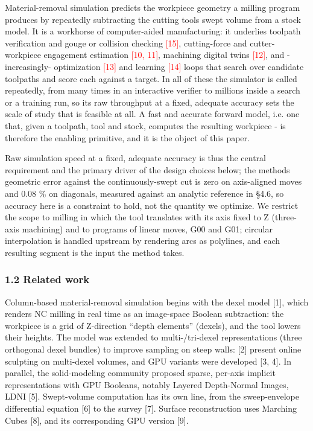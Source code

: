 \documentclass[
]{article}
\begin{document}
Material-removal simulation predicts the workpiece geometry a milling
program produces by repeatedly subtracting the cutting
tool\textquotesingle s swept volume from a stock model. It is a
workhorse of computer-aided manufacturing: it underlies toolpath
verification and gouge or collision checking \textcolor{red}{[15]}, cutting-force and
cutter-workpiece engagement estimation \textcolor{red}{[10, 11]}, machining digital
twins \textcolor{red}{[12]}, and -increasingly- optimization \textcolor{red}{[13]} and learning
\textcolor{red}{[14]} loops that search over candidate toolpaths and score each
against a target. In all of these the simulator is called repeatedly,
from many times in an interactive verifier to millions inside a search
or a training run, so its raw throughput at a fixed, adequate accuracy
sets the scale of study that is feasible at all. A fast and accurate
forward model, i.e. one that, given a toolpath, tool and stock, computes the
resulting workpiece - is therefore the enabling primitive, and it is the
object of this paper.

Raw simulation speed at a fixed, adequate accuracy is thus the central
requirement and the primary driver of the design choices below; the
method\textquotesingle s geometric error against the continuously-swept
cut is zero on axis-aligned moves and 0.08 \% on diagonals, measured
against an analytic reference in §4.6, so accuracy here is a constraint
to hold, not the quantity we optimize. We restrict the scope to milling
in which the tool translates with its axis fixed to Z (three-axis
machining) and to programs of linear moves, G00 and G01; circular
interpolation is handled upstream by rendering arcs as polylines, and
each resulting segment is the input the method takes.

\hypertarget{related-work}{%
\subsubsection{1.2 Related work}\label{related-work}}

Column-based material-removal simulation begins with the dexel model
{[}1{]}, which renders NC milling in real time as an image-space Boolean
subtraction: the workpiece is a grid of Z-direction ``depth elements''
(dexels), and the tool lowers their heights. The model was extended to
multi-/tri-dexel representations (three orthogonal dexel bundles) to
improve sampling on steep walls: {[}2{]} present online sculpting on
multi-dexel volumes, and GPU variants were developed {[}3, 4{]}. In
parallel, the solid-modeling community proposed sparse, per-axis
implicit representations with GPU Booleans, notably Layered Depth-Normal
Images, LDNI {[}5{]}. Swept-volume computation has its own line, from
the sweep-envelope differential equation {[}6{]} to the survey {[}7{]}.
Surface reconstruction uses Marching Cubes {[}8{]}, and its
corresponding GPU version {[}9{]}.
\end{document}

